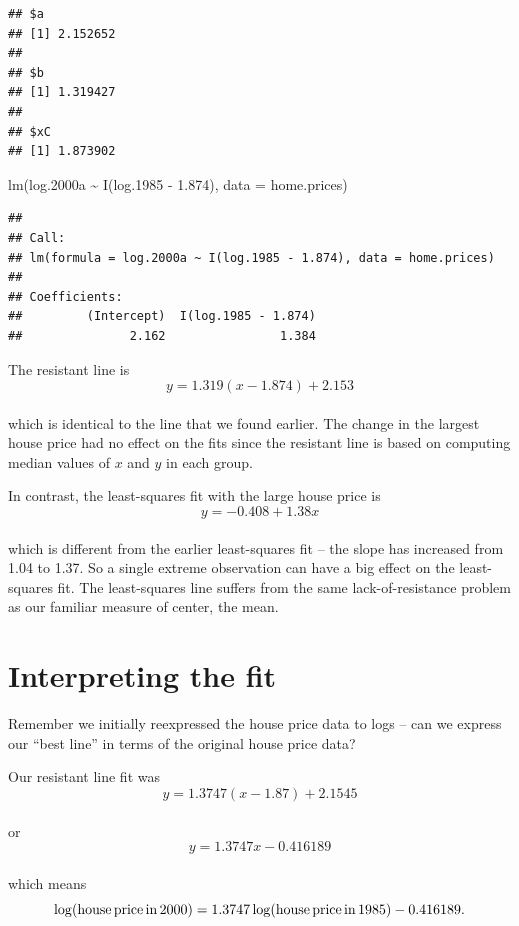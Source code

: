 \documentclass[
]{book}
\newenvironment{Shaded}{\begin{snugshade}}{\end{snugshade}}
\newcommand{\AttributeTok}[1]{\textcolor[rgb]{0.77,0.63,0.00}{#1}}
\newcommand{\FloatTok}[1]{\textcolor[rgb]{0.00,0.00,0.81}{#1}}
\newcommand{\FunctionTok}[1]{\textcolor[rgb]{0.00,0.00,0.00}{#1}}
\newcommand{\NormalTok}[1]{#1}
\newcommand{\SpecialCharTok}[1]{\textcolor[rgb]{0.00,0.00,0.00}{#1}}
\begin{document}
\begin{verbatim}
## $a
## [1] 2.152652
## 
## $b
## [1] 1.319427
## 
## $xC
## [1] 1.873902
\end{verbatim}

\begin{Shaded}
\begin{Highlighting}[]
\FunctionTok{lm}\NormalTok{(log}\FloatTok{.2000}\NormalTok{a }\SpecialCharTok{\textasciitilde{}} \FunctionTok{I}\NormalTok{(log}\FloatTok{.1985} \SpecialCharTok{{-}} \FloatTok{1.874}\NormalTok{), }\AttributeTok{data =}\NormalTok{ home.prices)}
\end{Highlighting}
\end{Shaded}

\begin{verbatim}
## 
## Call:
## lm(formula = log.2000a ~ I(log.1985 - 1.874), data = home.prices)
## 
## Coefficients:
##         (Intercept)  I(log.1985 - 1.874)  
##               2.162                1.384
\end{verbatim}

The resistant line is
\[        
          y = 1.319 (x - 1.874) + 2.153
\]\\
which is identical to the line that we found earlier. The change in the largest house price had no effect on the fits since the resistant line is based on computing median values of \(x\) and \(y\) in each group.

In contrast, the least-squares fit with the large house price is
\[          
          y = - 0.408 + 1.38 x
\]\\
which is different from the earlier least-squares fit -- the slope has increased from 1.04 to 1.37. So a single extreme observation can have a big effect on the least-squares fit. The least-squares line suffers from the same lack-of-resistance problem as our familiar measure of center, the mean.

\hypertarget{interpreting-the-fit}{%
\section{Interpreting the fit}\label{interpreting-the-fit}}

Remember we initially reexpressed the house price data to logs -- can we express our ``best line'' in terms of the original house price data?

Our resistant line fit was
\[          
          y = 1.3747 (x - 1.87) + 2.1545
\]\\
or
\[
y = 1.3747 x -0.416189
\]\\
which means
\[        
          \log ({\rm house \, price \,  in \, 2000}) = 1.3747 \log(
          {\rm house \, price \, in \, 1985}) -0.416189.
\]
\end{document}
